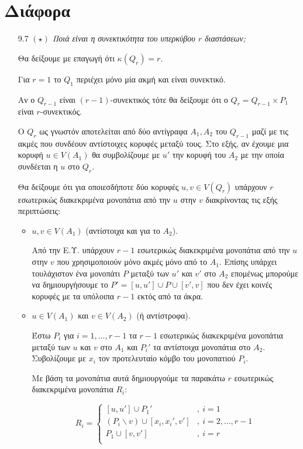 \documentclass[a4paper, oneside, 11pt]{article}
\theoremstyle{definition}
\begin{document}
\section{Διάφορα}

\begin{enumerate}
   \item[9.7] \emph{$(\star)$ Ποιά είναι η συνεκτικότητα του υπερκύβου
   $r$ διαστάσεων;}

   Θα δείξουμε με επαγωγή ότι $\kappa(Q_r) = r$.

   Για $r = 1$ το $Q_1$ περιέχει μόνο μία ακμή και είναι συνεκτικό.

   Αν ο $Q_{r-1}$ είναι $(r-1)$-συνεκτικός τότε θα δείξουμε ότι
   ο $Q_r = Q_{r-1} \times P_1$ είναι $r$-συνεκτικός.

   Ο $Q_r$ ως γνωστόν αποτελείται από δύο αντίγραφα $A_1, A_2$ του $Q_{r-1}$
   μαζί με τις ακμές που συνδέουν αντίστοιχες κορυφές μεταξύ τους.
   Στο εξής, αν έχουμε μια κορυφή $u \in V(A_1)$ θα συμβολίζουμε
   με $u'$ την κορυφή του $A_2$ με την οποία συνδέεται η $u$ στο
   $Q_r$.

   Θα δείξουμε ότι για οποιεσδήποτε δύο κορυφές $u, v \in V(Q_r)$
   υπάρχουν $r$ εσωτερικώς διακεκριμένα μονοπάτια από την $u$ στην
   $v$ διακρίνοντας τις εξής περιπτώσεις:

   \begin{itemize}
      \item $u, v \in V(A_1)$ (αντίστοιχα και για το $A_2$).

      Από την Ε.Υ. υπάρχουν $r-1$ εσωτερικώς διακεκριμένα μονοπάτια
      από την $u$ στην $v$ που χρησιμοποιούν μόνο ακμές μόνο από το
      $A_1$. Επίσης υπάρχει τουλάχιστον ένα μονοπάτι $P$ μεταξύ των
      $u'$ και $v'$ στο $A_2$ επομένως μπορούμε να δημιουργήσουμε
      το $P' = [u, u'] \cup P \cup [v', v]$ που δεν έχει κοινές κορυφές με
      τα υπόλοιπα $r-1$ εκτός από τα άκρα.

      \item $u \in V(A_1)$ και $v \in V(A_2)$ (ή αντίστροφα).

      Έστω $P_i$ για $i = 1, \ldots, r-1$ τα $r-1$ εσωτερικώς
      διακεκριμένα μονοπάτια μεταξύ των $u$ και $v$ στο $A_1$ και
      $P_i'$ τα αντίστοιχα μονοπάτια στο $A_2$. Συβολίζουμε με
      $x_i$ τον προτελευταίο κόμβο του μονοπατιού $P_i$.

      Με βάση τα μονοπάτια αυτά δημιουργούμε τα παρακάτω $r$
      εσωτερικώς διακεκριμένα μονοπάτια $R_i$:

      \begin{equation*}
         R_i = \left\{
            \begin{array}{cl}
               [u, u']\cup P_1' &, \ i = 1\\
               (P_i \backslash v) \cup [x_i, x_i', v'] &, \ i = 2, \ldots, r-1\\
               P_1 \cup [v, v'] &,\ i = r\\
            \end{array}
            \right.
      \end{equation*}


\end{itemize}
\end{enumerate}
\end{document}
